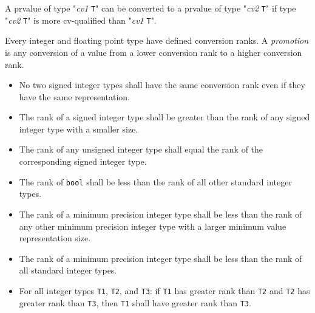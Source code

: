 
A prvalue of type "\textit{cv1} \texttt{T}" can be converted to a prvalue of type
"\textit{cv2} \texttt{T}" if type "\textit{cv2} \texttt{T}" is more cv-qualified
than "\textit{cv1} \texttt{T}".


\p Every integer and floating point type have defined conversion ranks.
A \textit{promotion} is any conversion of a value from a lower conversion rank
to a higher conversion rank.


\begin{itemize}
  \item  No two signed integer types shall have the same conversion rank even if
  they have the same representation.
  \item The rank of a signed integer type shall be greater than the rank of any
  signed integer type with a smaller size.
  \item The rank of any unsigned integer type shall equal the rank of the
  corresponding signed integer type.
  \item The rank of \texttt{bool} shall be less than the rank of all other
  standard integer types.
  \item The rank of a minimum precision integer type shall be less than the rank
  of any other minimum precision integer type with a larger minimum value
  representation size.
  \item The rank of a minimum precision integer type shall be less than the rank
  of all standard integer types.
  \item For all integer types \texttt{T1}, \texttt{T2}, and \texttt{T3}: if
  \texttt{T1} has greater rank than \texttt{T2} and \texttt{T2} has greater rank
  than \texttt{T3}, then \texttt{T1} shall have greater rank than \texttt{T3}.
\end{itemize}


